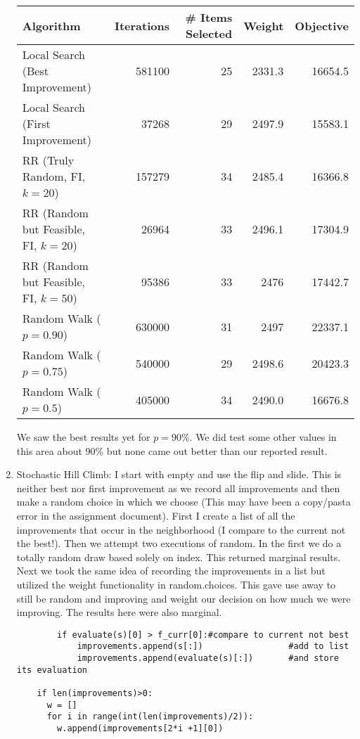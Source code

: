 \documentclass[11pt]{article}
\begin{document}
\begin{enumerate}
\begin{tabular}{lrrrr}
Algorithm&Iterations&\# Items Selected&Weight&Objective\\ \hline
Local Search (Best Improvement)&581100&25&2331.3&16654.5\\ 
Local Search (First Improvement)&37268&29&2497.9&15583.1\\
RR (Truly Random, FI, $k=20$) & 157279&34&2485.4&16366.8\\
RR (Random but Feasible, FI, $k = 20$)& 26964&33&2496.1&17304.9\\
RR (Random but Feasible, FI, $k = 50$)& 95386&33&2476&17442.7\\
Random Walk ($p = 0.90$) & 630000&31&2497&22337.1\\
Random Walk ($p = 0.75$) & 540000&29&2498.6&20423.3\\
Random Walk ($p = 0.5$) & 405000&34&2490.0&16676.8\\
\hline
\end{tabular}
We saw the best results yet for $p = 90\%$.  We did test some other values in this area about 90\% but none came out better than our reported result.

\item Stochastic Hill Climb:  I start with empty and use the flip and slide.  This is neither best nor first improvement as we record all improvements and then make a random choice in which we choose (This may have been a copy/pasta error in the assignment document).  First I create a list of all the improvements that occur in the neighborhood (I compare to the current not the best!).  Then we attempt two executions of random.  In the first we do a totally random draw based solely on index.  This returned marginal results.  Next we took the same idea of recording the improvements in a list but utilized the weight functionality in random.choices.  This gave use away to still be random and improving and weight our decision on how much we were improving. The results here were also marginal.
\begin{verbatim}
        if evaluate(s)[0] > f_curr[0]:#compare to current not best
            improvements.append(s[:])                 #add to list
            improvements.append(evaluate(s)[:])       #and store its evaluation

    if len(improvements)>0:
      w = []
      for i in range(int(len(improvements)/2)):
        w.append(improvements[2*i +1][0])



\end{verbatim}
\end{enumerate}
\end{document}
